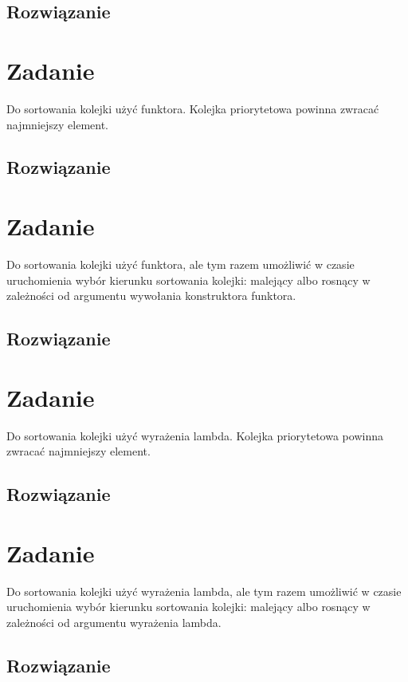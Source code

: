 \documentclass{article}
\begin{document}
\subsection{Rozwiązanie}



\section{Zadanie}

Do sortowania kolejki użyć funktora.  Kolejka priorytetowa powinna
zwracać najmniejszy element.

\subsection{Rozwiązanie}



\section{Zadanie}

Do sortowania kolejki użyć funktora, ale tym razem umożliwić w czasie
uruchomienia wybór kierunku sortowania kolejki: malejący albo rosnący
w zależności od argumentu wywołania konstruktora funktora.

\subsection{Rozwiązanie}



\section{Zadanie}

Do sortowania kolejki użyć wyrażenia lambda.  Kolejka priorytetowa
powinna zwracać najmniejszy element.

\subsection{Rozwiązanie}



\section{Zadanie}

Do sortowania kolejki użyć wyrażenia lambda, ale tym razem umożliwić w
czasie uruchomienia wybór kierunku sortowania kolejki: malejący albo
rosnący w zależności od argumentu wyrażenia lambda.

\subsection{Rozwiązanie}


\end{document}
